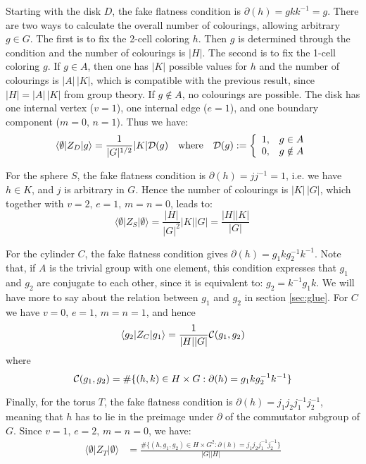 \documentclass[a4paper,11pt]{article}
\begin{document}
Starting with the disk $D$, the fake flatness condition is $\partial(h) = gkk^{-1}=g$. There are two ways to calculate the overall number of colourings, allowing arbitrary $g\in G$. The first is to fix the 2-cell coloring $h$. Then $g$ is determined through the condition and the number of colourings is $|H|$. The second is to fix the 1-cell coloring $g$. If $g \in A$, then one has $|K|$ possible values for $h$ and the number of colourings is $|A|\, |K|$, which is compatible with the previous result, since $|H|=|A|\,|K|$ from group theory. If $g \notin A$, no colourings are possible. The disk has one internal vertex ($v=1$), one internal edge ($e=1$), and one boundary component ($m=0,\,n=1$). Thus we have:
$$
\langle \emptyset |Z_D| g \rangle = \frac{1}{|G|^{1/2}} |K| {\cal D}(g)\quad {\rm where} \quad {\cal D}(g) :=\left\{ \begin{array}{cc} 1, & g \in A \\ 0, & g\notin A \end{array} \right . 
$$


For the sphere $S$, the fake flatness condition is $\partial(h)=jj^{-1}=1$, i.e. we have $h\in K$, and $j$ is arbitrary in $G$. Hence the number of colourings is 
$|K|\, |G|$, which together with $v=2,\, e=1,\, m=n=0$, leads to:
$$
\langle \emptyset |Z_S| \emptyset \rangle = \frac{|H|}{|G|^2} |K| |G|= \frac{|H||K|}{|G|} \,
$$




For the cylinder $C$, the fake flatness condition gives $\partial(h) = g_1 k g_2^{-1} k^{-1}$. Note that, if $A$ is the trivial group with one element, this condition expresses that $g_1$ and $g_2$ are conjugate to each other, since it is equivalent to: $g_2= k^{-1} g_1 k$. We will have more to say about the relation between $g_1$ and $g_2$ in section \ref{sec:glue}. For $C$ we have $v=0,\, e=1, \, m=n=1$, and hence
$$
\langle g_2 |Z_C| g_1 \rangle = \frac{1}{|H| |G|} {\cal C}(g_1,g_2) 
$$
where
\begin{equation}
{\cal C}(g_1,g_2)=\# \{ (h,k) \in H \times G : \partial(h) = g_1 k g_2^{-1} k^{-1} \}
\label{eq:Cdef}
\end{equation}



Finally, for the torus $T$, the fake flatness condition is $\partial(h)=j_1 j_2 j_1^{-1} j_2^{-1} $, meaning that $h$ has to lie in the preimage under $\partial$ of the commutator subgroup of $G$. Since $v=1,\, e= 2,\, m=n=0$, we have:
\begin{align}
\langle \emptyset |Z_T| \emptyset \rangle &= \frac{\#\{(h,g_1,g_2) \in H \times G^2 : \partial(h)=j_1 j_2 j_1^{-1} j_2^{-1}\}}{|G| |H|} 
\label{eq:Ztorus}
\end{align}
\end{document}
